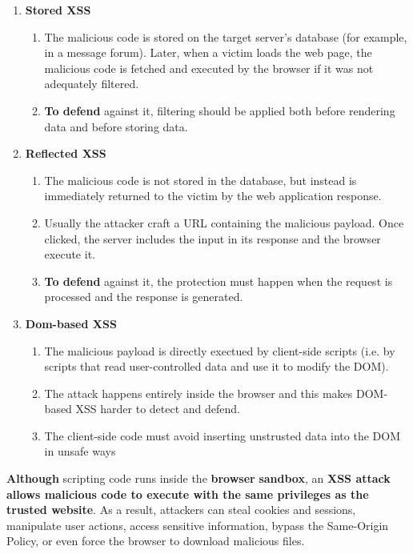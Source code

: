 \documentclass{article}
\begin{document}
\begin{enumerate}
    \item \textbf{Stored XSS}
    \begin{enumerate}
        \item The malicious code is stored on the target server's database (for example, in a message forum). Later, when a victim loads the web page, the malicious code is fetched and executed by the browser if it was not adequately filtered.
        \item \textbf{To defend} against it, filtering should be applied both before rendering data and before storing data.
    \end{enumerate}
    \item \textbf{Reflected XSS}
    \begin{enumerate}
        \item The malicious code is not stored in the database, but instead is immediately returned to the victim by the web application response.
        \item Usually the attacker craft a URL containing the malicious payload. Once clicked, the server includes the input in its response and the browser execute it.
        \item \textbf{To defend} against it, the protection must happen when the request is processed and the response is generated.
    \end{enumerate}
    \item \textbf{Dom-based XSS}
    \begin{enumerate}
        \item The malicious payload is directly exectued by client-side scripts (i.e. by scripts that read user-controlled data and use it to modify the DOM).
        \item The attack happens entirely inside the browser and this makes DOM-based XSS harder to detect and defend.
        \item The client-side code must avoid inserting unstrusted data into the DOM in unsafe ways
    \end{enumerate}
\end{enumerate}

\textbf{Although} scripting code runs inside the \textbf{browser} \textbf{sandbox}, an \textbf{XSS attack allows malicious code to execute with the same privileges as the trusted website}. As a result, attackers can steal cookies and sessions, manipulate user actions, access sensitive information, bypass the Same-Origin Policy, or even force the browser to download malicious files.
\end{document}
